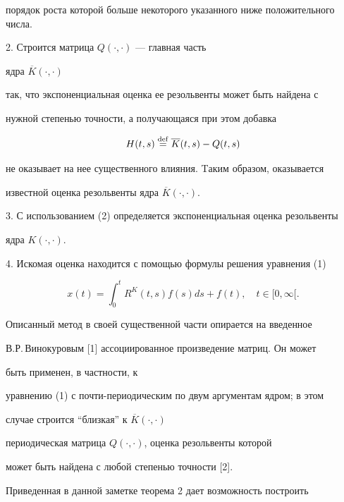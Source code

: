 порядок роста которой больше некоторого указанного ниже положительного числа.





2. Строится матрица $Q(\cdot,\cdot)$ --- главная часть


ядра $\overline K(\cdot,\cdot)$ 


так, что экспоненциальная оценка ее резольвенты может быть найдена с


нужной степенью точности, а получающаяся при этом добавка


$$


H(t,s)\df \overline K(t,s)-Q(t,s)


$$


не оказывает на нее существенного влияния. Tаким образом, оказывается


известной оценка резольвенты ядра $\overline K(\cdot,\cdot)$.





3. С использованием (2) определяется экспоненциальная оценка резольвенты


ядра $K(\cdot,\cdot)$.





4. Искомая оценка находится с помощью формулы решения уравнения (1)


\begin{equation}


x(t)=\int_0^t R^K(t,s)f(s)ds+f(t),\quad t\in[0,\infty[.


\end{equation}





Описанный метод в своей существенной части опирается на введенное


В.Р.\,Винокуровым [1] ассоциированное произведение матриц. Он может


быть применен, в частности, к


уравнению (1) с почти-периодическим по двум аргументам ядром; в этом


случае строится ``близкая'' к $\overline K(\cdot,\cdot)$


периодическая матрица $Q(\cdot,\cdot)$, оценка резольвенты которой


может быть найдена с любой степенью точности [2].





Приведенная в данной заметке теорема 2 дает возможность построить 


